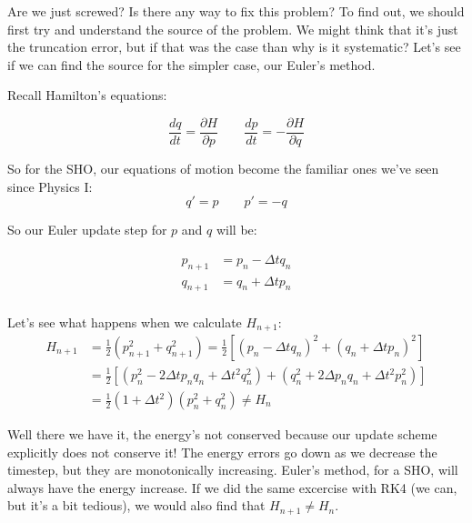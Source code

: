 \documentclass{article}
\theoremstyle{demo}
\begin{document}
Are we just screwed?  Is there any way to fix this problem?  To find out, we
should first try and understand the source of the problem.  We might think that
it's just the truncation error, but if that was the case than why is it
systematic? Let's see if we can find the source for the simpler case, our
Euler's method.

Recall Hamilton's equations:

\begin{equation}
    \frac{dq}{dt} = \frac{\partial H}{\partial p} \qquad \frac{dp}{dt} =
    -\frac{\partial H}{\partial q}
\end{equation}

So for the SHO, our equations of motion become the familiar ones we've seen
since Physics I:
\begin{equation}
    q' = p \qquad p' = - q
\end{equation}

So our Euler update step for $p$ and $q$ will be: 

\begin{equation}
    \begin{aligned}
        p_{n+1} & = p_n - \Delta t q_n \\
        q_{n+1} & = q_n + \Delta t p_n \\
    \end{aligned}
\end{equation}

Let's see what happens when we calculate $H_{n+1}$:
\begin{equation}
    \begin{aligned}
        H_{n+1} & = \frac{1}{2}(p_{n+1}^2 + q_{n+1}^2) =
        \frac{1}{2}\left[\left(p_n -
        \Delta t q_n\right)^2 + \left(q_n + \Delta t p_n\right)^2 \right]\\
        &= \frac{1}{2}\left[(p_n^2 -2\Delta t p_n q_n + \Delta t^2 q_n^2) +
        (q_n^2 + 2\Delta p_n q_n + \Delta t^2 p_n^2) \right] \\
        &= \frac{1}{2}(1+\Delta t^2)(p_n^2 + q_n^2) \neq H_n
    \end{aligned}
\end{equation}

Well there we have it, the energy's not conserved because our update scheme
explicitly does not conserve it!  The energy errors go down as we decrease the
timestep, but they are monotonically increasing.  Euler's method, for a SHO,
will always have the energy increase.  If we did the same excercise with RK4 (we
can, but it's a bit tedious), we would also find that $H_{n+1} \neq H_n$.
\end{document}
